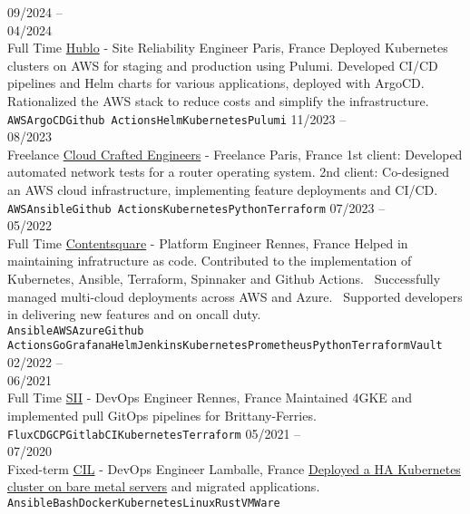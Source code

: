 \documentclass[10pt]{developercv}
\begin{document}
\begin{entrylist}
	\entry
		{09/2024 --\\04/2024\\\footnotesize{Full Time}}
		{\href{https://www.hublo.com/}{Hublo} - Site Reliability Engineer}
		{Paris, France}
		{Deployed Kubernetes clusters on AWS for staging and production using Pulumi.
		 Developed CI/CD pipelines and Helm charts for various applications, deployed with ArgoCD.
		 Rationalized the AWS stack to reduce costs and simplify the infrastructure.\\
		\texttt{AWS}\slashsep\texttt{ArgoCD}\slashsep\texttt{Github Actions}\slashsep\texttt{Helm}\slashsep\texttt{Kubernetes}\slashsep\texttt{Pulumi}}
	\entry
		{11/2023 --\\08/2023\\\footnotesize{Freelance}}
		{\href{https://craftedengineers.cloud/}{Cloud Crafted Engineers} - Freelance}
		{Paris, France}
		{1st client: Developed automated network tests for a router operating system.
		2nd client: Co-designed an AWS cloud infrastructure, implementing feature deployments and CI/CD.\\
		\texttt{AWS}\slashsep\texttt{Ansible}\slashsep\texttt{Github Actions}\slashsep\texttt{Kubernetes}\slashsep\texttt{Python}\slashsep\texttt{Terraform}}
	\entry
		{07/2023 --\\05/2022\\\footnotesize{Full Time}}
		{\href{https://contentsquare.com/}{Contentsquare} - Platform Engineer}
		{Rennes, France}
		{Helped in maintaining infratructure as code. Contributed to the implementation of Kubernetes, Ansible, Terraform, Spinnaker and Github Actions. \
		Successfully managed multi-cloud deployments across AWS and Azure. \
		Supported developers in delivering new features and on oncall duty.\\
		\texttt{Ansible}\slashsep\texttt{AWS}\slashsep\texttt{Azure}\slashsep\texttt{Github Actions}\slashsep\texttt{Go}\slashsep\texttt{Grafana}\slashsep\texttt{Helm}\slashsep\texttt{Jenkins}\slashsep\texttt{Kubernetes}\slashsep\texttt{Prometheus}\slashsep\texttt{Python}\slashsep\texttt{Terraform}\slashsep\texttt{Vault}}
	\entry
		{02/2022 --\\06/2021\\\footnotesize{Full Time}}
		{\href{https://sii-group.com/}{SII} - DevOps Engineer}
		{Rennes, France}
		{Maintained 4GKE and implemented pull GitOps pipelines for Brittany-Ferries.\\
		\texttt{FluxCD}\slashsep\texttt{GCP}\slashsep\texttt{GitlabCI}\slashsep\texttt{Kubernetes}\slashsep\texttt{Terraform}}
	\entry
		{05/2021 --\\07/2020\\\footnotesize{Fixed-term}}
		{\href{https://www.cil-lamballe.com/}{CIL} - DevOps Engineer}
		{Lamballe, France}
		{\href{https://github.com/Ant0wan/VMWare-Kubenetes-cluster}{Deployed a HA Kubernetes cluster on bare metal servers} and migrated applications.\\
		\texttt{Ansible}\slashsep\texttt{Bash}\slashsep\texttt{Docker}\slashsep\texttt{Kubernetes}\slashsep\texttt{Linux}\slashsep\texttt{Rust}\slashsep\texttt{VMWare}}
\end{entrylist}
\end{document}
